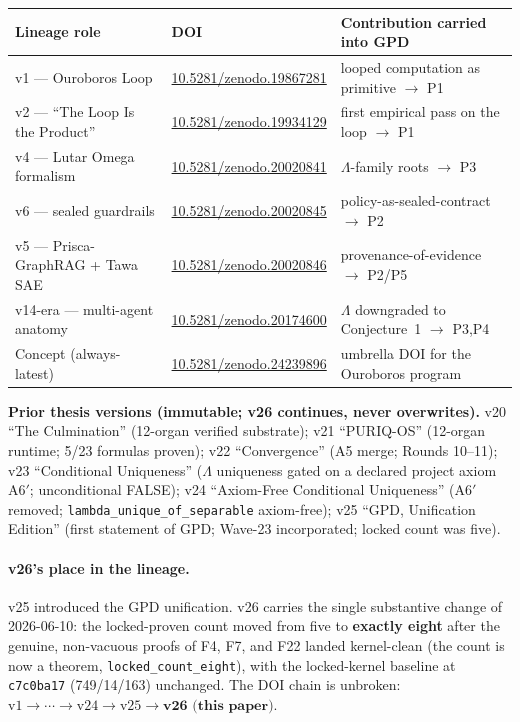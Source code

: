 \documentclass[11pt,letterpaper]{article}
\theoremstyle{definition}
\newcommand{\Lam}{\Lambda}
\begin{document}
\begin{center}\small
\begin{tabular}{@{}lll@{}}
\toprule
\textbf{Lineage role} & \textbf{DOI} & \textbf{Contribution carried into GPD} \\
\midrule
v1 --- Ouroboros Loop & \href{https://doi.org/10.5281/zenodo.19867281}{10.5281/zenodo.19867281} & looped computation as primitive $\to$ P1 \\
v2 --- ``The Loop Is the Product'' & \href{https://doi.org/10.5281/zenodo.19934129}{10.5281/zenodo.19934129} & first empirical pass on the loop $\to$ P1 \\
v4 --- Lutar Omega formalism & \href{https://doi.org/10.5281/zenodo.20020841}{10.5281/zenodo.20020841} & $\Lam$-family roots $\to$ P3 \\
v6 --- sealed guardrails & \href{https://doi.org/10.5281/zenodo.20020845}{10.5281/zenodo.20020845} & policy-as-sealed-contract $\to$ P2 \\
v5 --- Prisca-GraphRAG + Tawa SAE & \href{https://doi.org/10.5281/zenodo.20020846}{10.5281/zenodo.20020846} & provenance-of-evidence $\to$ P2/P5 \\
v14-era --- multi-agent anatomy & \href{https://doi.org/10.5281/zenodo.20174600}{10.5281/zenodo.20174600} & $\Lam$ downgraded to Conjecture~1 $\to$ P3,P4 \\
Concept (always-latest) & \href{https://doi.org/10.5281/zenodo.24239896}{10.5281/zenodo.24239896} & umbrella DOI for the Ouroboros program \\
\bottomrule
\end{tabular}
\end{center}

\noindent\textbf{Prior thesis versions (immutable; v26 continues, never
overwrites).} v20 ``The Culmination'' (12-organ verified substrate); v21
``PURIQ-OS'' (12-organ runtime; 5/23 formulas proven); v22 ``Convergence''
(A5 merge; Rounds 10--11); v23 ``Conditional Uniqueness'' ($\Lam$ uniqueness
gated on a declared project axiom A6$'$; unconditional FALSE); v24 ``Axiom-Free
Conditional Uniqueness'' (A6$'$ removed; \texttt{lambda\_unique\_of\_separable}
axiom-free); v25 ``GPD, Unification Edition'' (first statement of GPD; Wave-23
incorporated; locked count was five).

\paragraph{v26's place in the lineage.} v25 introduced the GPD unification. v26
carries the single substantive change of 2026-06-10: the locked-proven count
moved from five to \textbf{exactly eight} after the genuine, non-vacuous proofs
of F4, F7, and F22 landed kernel-clean (the count is now a theorem,
\texttt{locked\_count\_eight}), with the locked-kernel baseline at
\texttt{c7c0ba17} (749/14/163) unchanged. The DOI chain is unbroken:
$\text{v1}\to\cdots\to\text{v24}\to\text{v25}\to\textbf{v26 (this paper)}$.
\end{document}
